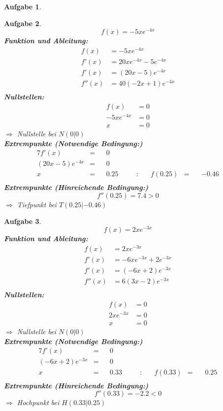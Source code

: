 \documentclass[12pt]{article}
\theoremstyle{note}
\newtheorem{aufgabe}{Aufgabe}
\begin{document}
\begin{flushleft}
\begin{aufgabe}
\end{aufgabe}\clearpage\begin{aufgabe} ~  
$$f(x)=- 5 x e^{- 4 x}$$ 
{\bf Funktion und Ableitung:} 
\begin{align*} 
f(x)&=- 5 x e^{- 4 x}\\ 
f'(x)&=20 x e^{- 4 x} - 5 e^{- 4 x}\\ 
f'(x)&=\left(20 x - 5\right) e^{- 4 x}\\ 
f''(x)&=40 \left(- 2 x + 1\right) e^{- 4 x}\\ 
\end{align*} 
{\bf Nullstellen:} 
\begin{align*} 
f(x)&=0 \\ 
- 5 x e^{- 4 x}&=0 \\ 
x&=0\end{align*} 
$\Rightarrow$ Nullstelle bei $N(0|0)$ \\ 
{\bf Extrempunkte (Notwendige Bedingung:)} 
\begin{alignat*}{7} 
f'(x)&=& &0& \\ 
\left(20 x - 5\right) e^{- 4 x}&=& &0& \\ 
x&=& &0.25& \quad &:& \quad f(0.25)&=& \, &-0.46\\ 
\end{alignat*} 
{\bf Extrempunkte (Hinreichende Bedingung:)} 
\\ 
$$f''(0.25)=7.4> 0 $$ 
$\Rightarrow$ Tiefpunkt bei $T(0.25|-0.46)$ \\ 

\end{aufgabe}\clearpage\begin{aufgabe} ~  
$$f(x)=2 x e^{- 3 x}$$ 
{\bf Funktion und Ableitung:} 
\begin{align*} 
f(x)&=2 x e^{- 3 x}\\ 
f'(x)&=- 6 x e^{- 3 x} + 2 e^{- 3 x}\\ 
f'(x)&=\left(- 6 x + 2\right) e^{- 3 x}\\ 
f''(x)&=6 \left(3 x - 2\right) e^{- 3 x}\\ 
\end{align*} 
{\bf Nullstellen:} 
\begin{align*} 
f(x)&=0 \\ 
2 x e^{- 3 x}&=0 \\ 
x&=0\end{align*} 
$\Rightarrow$ Nullstelle bei $N(0|0)$ \\ 
{\bf Extrempunkte (Notwendige Bedingung:)} 
\begin{alignat*}{7} 
f'(x)&=& &0& \\ 
\left(- 6 x + 2\right) e^{- 3 x}&=& &0& \\ 
x&=& &0.33& \quad &:& \quad f(0.33)&=& \, &0.25\\ 
\end{alignat*} 
{\bf Extrempunkte (Hinreichende Bedingung:)} 
\\ 
$$f''(0.33)=-2.2< 0 $$ 
$\Rightarrow$ Hochpunkt bei $H(0.33|0.25)$ \\ 


\end{aufgabe}
\end{flushleft}
\end{document}
